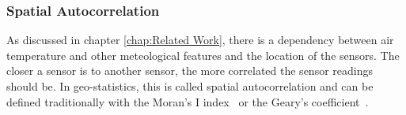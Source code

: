 \subsubsection{Spatial Autocorrelation}

As discussed in chapter \ref{chap:Related Work}, there is a dependency between air temperature and other meteological features and the location of the sensors. The closer a sensor is to another sensor, the more correlated the sensor readings should be.
In geo-statistics, this is called spatial autocorrelation and can be defined traditionally with the Moran's I index~\cite{moran1948interpretation} or the Geary's coefficient~\cite{geary1954contiguity}. 

